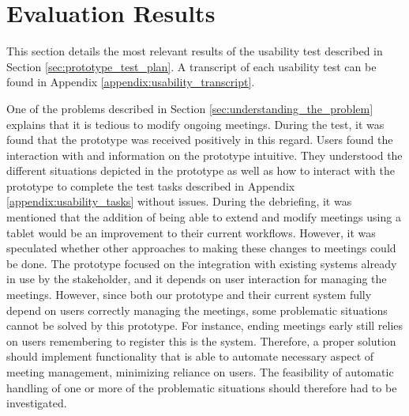 \section{Evaluation Results}\label{sec:usability_evaluation_results}
This section details the most relevant results of the usability test described in Section \ref{sec:prototype_test_plan}.
A transcript of each usability test can be found in Appendix \ref{appendix:usability_transcript}.

One of the problems described in Section \ref{sec:understanding_the_problem} explains that it is tedious to modify ongoing meetings. 
During the test, it was found that the prototype was received positively in this regard. 
Users found the interaction with and information on the prototype intuitive. 
They understood the different situations depicted in the prototype as well as how to interact with the prototype to complete the test tasks described in Appendix \ref{appendix:usability_tasks} without issues.
During the debriefing, it was mentioned that the addition of being able to extend and modify meetings using a tablet would be an improvement to their current workflows.
However, it was speculated whether other approaches to making these changes to meetings could be done. 
The prototype focused on the integration with existing systems already in use by the stakeholder, and it depends on user interaction for managing the meetings.
However, since both our prototype and their current system fully depend on users correctly managing the meetings, some problematic situations cannot be solved by this prototype. 
For instance, ending meetings early still relies on users remembering to register this is the system. 
Therefore, a proper solution should implement functionality that is able to automate necessary aspect of meeting management, minimizing reliance on users.
The feasibility of  automatic handling of one or more of the problematic situations should therefore had to be investigated.